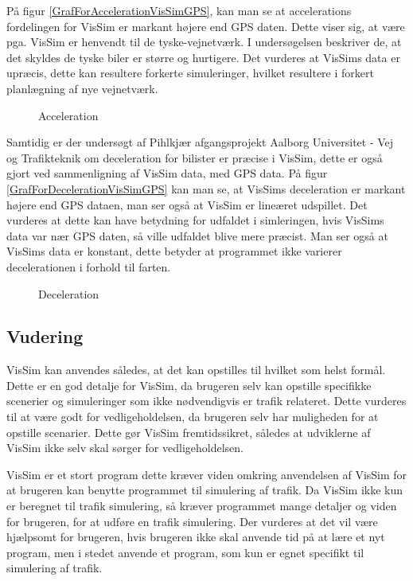 På figur \ref{GrafForAccelerationVisSimGPS}, kan man se at accelerations fordelingen for VisSim er markant højere end GPS daten. Dette viser sig, at være pga. VisSim er henvendt til de tyske-vejnetværk. I undersøgelsen beskriver de, at det skyldes de tyske biler er større og hurtigere. Det vurderes at VisSims data er upræcis, dette kan resultere forkerte simuleringer, hvilket resultere i forkert planlægning af nye vejnetværk. 

\begin{figure}[h!]
    
    \caption{Acceleration}
    \label{plotacceleration}
\end{figure}

Samtidig er der undersøgt af Pihlkjær afgangsprojekt Aalborg Universitet - Vej og Trafikteknik om deceleration for bilister er præcise i VisSim, dette er også gjort ved sammenligning af VisSim data, med GPS data. På figur \ref{GrafForDecelerationVisSimGPS} kan man se, at VisSims deceleration er markant højere end GPS dataen, man ser også at VisSim er lineæret udspillet. Det vurderes at dette kan have betydning for udfaldet i simleringen, hvis VisSims data var nær GPS daten, så ville udfaldet blive mere præcist. Man ser også at VisSims data er konstant, dette betyder at programmet ikke varierer decelerationen i forhold til farten. 

\begin{figure}[h!]
    
    \caption{Deceleration}
    \label{plotdeceleration}
\end{figure}

\subsection{Vudering}
VisSim kan anvendes således, at det kan opstilles til hvilket som helst formål. Dette er en god detalje for VisSim, da brugeren selv kan opstille specifikke scenerier og simuleringer som ikke nødvendigvis er trafik relateret. Dette vurderes til at være godt for vedligeholdelsen, da brugeren selv har muligheden for at opstille scenarier. Dette gør VisSim fremtidssikret, således at udviklerne af VisSim ikke selv skal sørger for vedligeholdelsen.

VisSim er et stort program dette kræver viden omkring anvendelsen af VisSim for at brugeren kan benytte programmet til simulering af trafik. Da VisSim ikke kun er beregnet til trafik simulering, så kræver programmet mange detaljer og viden for brugeren, for at udføre en trafik simulering. Der vurderes at det vil være hjælpsomt for brugeren, hvis brugeren ikke skal anvende tid på at lære et nyt program, men i stedet anvende et program, som kun er egnet specifikt til simulering af trafik. 

